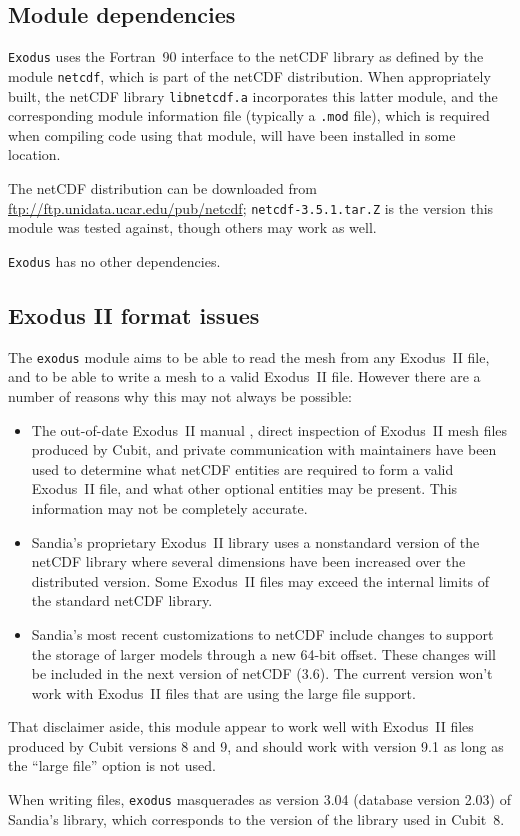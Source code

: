 \documentclass[oneside,12pt]{amsart}
\begin{document}
\subsection{Module dependencies}
\texttt{Exodus} uses the Fortran~90 interface to the netCDF library as defined
by the module \texttt{netcdf}, which is part of the netCDF distribution.  When
appropriately built, the netCDF library \texttt{libnetcdf.a} incorporates this
latter module, and the corresponding module information file (typically a
\texttt{.mod} file), which is required when compiling code using that module,
will have been installed in some location.

The netCDF distribution can be downloaded from
\url{ftp://ftp.unidata.ucar.edu/pub/netcdf}; \texttt{netcdf-3.5.1.tar.Z}
is the version this module was tested against, though others may work as well.

\texttt{Exodus} has no other dependencies. 

\subsection{Exodus II format issues}

The \texttt{exodus} module aims to be able to read the mesh from any
Exodus~II file, and to be able to write a mesh to a valid Exodus~II
file.  However there are a number of reasons why this may not always
be possible:
\begin{itemize}
\item The out-of-date Exodus~II manual \cite{exodusII}, direct inspection of
  Exodus~II mesh files produced by Cubit, and private communication with
  maintainers have been used to determine what netCDF entities are required
  to form a valid Exodus~II file, and what other optional entities may be
  present.  This information may not be completely accurate.
\item Sandia's proprietary Exodus~II library uses a nonstandard version of the
  netCDF library where several dimensions have been increased over the
  distributed version.  Some Exodus~II files may exceed the internal limits
  of the standard netCDF library.
\item Sandia's most recent customizations to netCDF include changes to
  support the storage of larger models through a new 64-bit offset.  These
  changes will be included in the next version of netCDF (3.6).  The current
  version won't work with Exodus~II files that are using the large file
  support.
\end{itemize}
That disclaimer aside, this module appear to work well with Exodus~II files
produced by Cubit versions 8 and 9, and should work with version 9.1 as long
as the ``large file'' option is not used.

When writing files, \texttt{exodus} masquerades as version 3.04 (database
version 2.03) of Sandia's library, which corresponds to the version of the
library used in Cubit~8.



\end{document}
